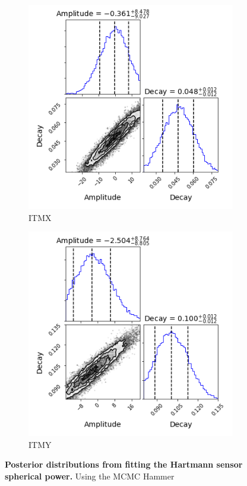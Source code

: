 \begin{figure}[ht]
	\centering
	\begin{subfigure}[b]{0.5\textwidth}
		\includegraphics[width=\linewidth]{../Figures/MCMC_ITMX_abs.png}
		\caption{ITMX}
		\label{fig:mcmc_itmx_abs}
	\end{subfigure}%
	\begin{subfigure}[b]{0.5\textwidth}
		\includegraphics[width=\linewidth]{../Figures/MCMC_ITMY_abs.png}
		\caption{ITMY}
		\label{fig:mcmc_itmy_abs}
	\end{subfigure}
	\caption[Posterior distributions from fitting the Hartmann sensor spherical power.]  
	{\textbf{Posterior distributions from fitting the Hartmann sensor spherical power.}  
	Using the MCMC Hammer \cite{MCMC_Hammer}}
	\label{fig:mcmc_hws_abs}
\end{figure}

